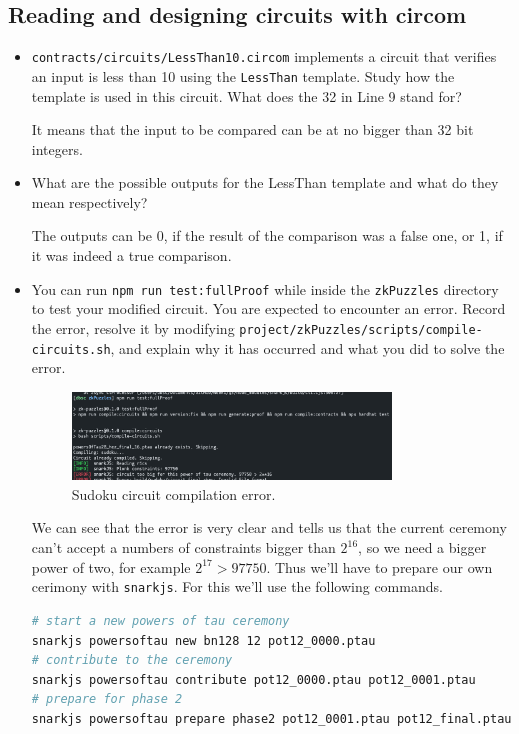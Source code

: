 \documentclass{article}
\begin{document}
\subsection*{Reading and designing circuits with circom}
\begin{itemize}
    \item \texttt{contracts/circuits/LessThan10.circom} implements a circuit that verifies an input is less than 10 using the \texttt{LessThan} template. Study how the template is used in this circuit. What does the 32 in Line 9 stand for? \par It means that the input to be compared can be at no bigger than 32 bit integers.
    \item What are the possible outputs for the LessThan template and what do they mean respectively? \par The outputs can be 0, if the result of the comparison was a false one, or 1, if it was indeed a true comparison.
    \item You can run \texttt{npm run test:fullProof} while inside the \texttt{zkPuzzles} directory to test your modified circuit. You are expected to encounter an error. Record the error, resolve it by modifying \texttt{project/zkPuzzles/scripts/compile-circuits.sh}, and explain why it has occurred and what you did to solve the error. \par
    \begin{figure}[h]
        \centering
        \includegraphics[width=0.8\textwidth]{error.png}
        \caption*{Sudoku circuit compilation error.}
    \end{figure}
    We can see that the error is very clear and tells us that the current ceremony can't accept a numbers of constraints bigger than $2^{16}$, so we need a bigger power of two, for example $2^{17} > 97750$. Thus we'll have to prepare our own cerimony with \texttt{snarkjs}. For this we'll use the following commands.
    \begin{lstlisting}[language=Bash]
# start a new powers of tau ceremony
snarkjs powersoftau new bn128 12 pot12_0000.ptau
# contribute to the ceremony
snarkjs powersoftau contribute pot12_0000.ptau pot12_0001.ptau
# prepare for phase 2
snarkjs powersoftau prepare phase2 pot12_0001.ptau pot12_final.ptau

\end{lstlisting}
\end{itemize}
\end{document}
